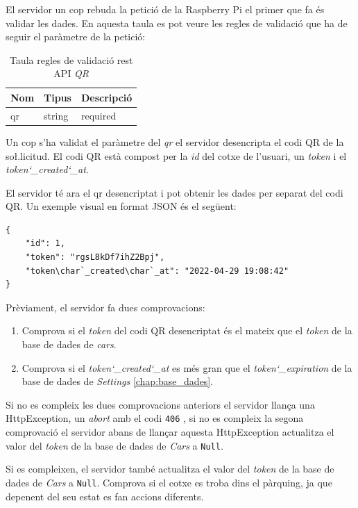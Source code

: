 El servidor un cop rebuda la petició de la Raspberry Pi el primer que fa és validar les dades.
En aquesta taula es pot veure les regles de validació que ha de seguir el paràmetre
de la petició:

\begin{table}[H]
\centering
\begin{tabular}{lll}
\hline
\textbf{Nom} & \textbf{Tipus} & \textbf{Descripció} \\ \hline
qr              & string       &  required     \\ \hline
\end{tabular}
\caption{Taula regles de validació rest API \emph{QR}}
\label{tab:my-cars-api-table}
\end{table}

Un cop s'ha validat el paràmetre del \emph{qr} el servidor desencripta el codi QR
de la so\l.licitud. El codi QR està compost per la \emph{id} del cotxe de l'usuari, un \emph{token}
i el \emph{token\char`_created\char`_at}.

El servidor té ara el qr desencriptat i pot obtenir les dades per separat del codi QR.
Un exemple visual en format JSON és el següent:

\begin{verbatim}
{
    "id": 1,
    "token": "rgsL8kDf7ihZ2Bpj",
    "token\char`_created\char`_at": "2022-04-29 19:08:42"
}
\end{verbatim}

Prèviament, el servidor fa dues comprovacions:
\begin{enumerate}
    \item Comprova si el \emph{token} del codi QR desencriptat és el mateix que el \emph{token} de la base de dades de \emph{cars}.
    \item Comprova si el \emph{token\char`_created\char`_at} es més gran que el \emph{token\char`_expiration}
    de la base de dades de \emph{Settings} \autoref{chap:base_dades}.
\end{enumerate}

Si no es compleix les dues comprovacions anteriors el servidor llança una HttpException,
un \emph{abort} amb el codi \texttt{406} \autocite{http_406_response}, si no es compleix la segona comprovació
el servidor abans de llançar aquesta HttpException actualitza el valor del \emph{token} de la base de dades de
\emph{Cars} a \texttt{Null}.

Si es compleixen, el servidor també actualitza el valor del \emph{token} de la base de dades de
\emph{Cars} a \texttt{Null}. Comprova si el cotxe es troba dins el pàrquing, ja que depenent del seu
estat es fan accions diferents.


